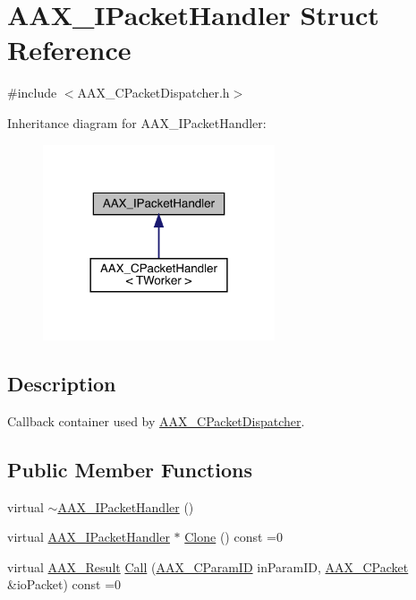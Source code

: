 \hypertarget{a01521}{}\section{A\+A\+X\+\_\+\+I\+Packet\+Handler Struct Reference}
\label{a01521}


{\ttfamily \#include $<$A\+A\+X\+\_\+\+C\+Packet\+Dispatcher.\+h$>$}



Inheritance diagram for A\+A\+X\+\_\+\+I\+Packet\+Handler\+:
\nopagebreak
\begin{figure}[H]
\begin{center}
\leavevmode
\includegraphics[width=194pt]{a01520}
\end{center}
\end{figure}


\subsection{Description}
Callback container used by \mbox{\hyperlink{a01529}{A\+A\+X\+\_\+\+C\+Packet\+Dispatcher}}. \subsection*{Public Member Functions}
\begin{DoxyCompactItemize}
\item 
virtual \mbox{\hyperlink{a01521_afaf774273572161ec49338cbf7e53a19}{$\sim$\+A\+A\+X\+\_\+\+I\+Packet\+Handler}} ()
\item 
virtual \mbox{\hyperlink{a01521}{A\+A\+X\+\_\+\+I\+Packet\+Handler}} $\ast$ \mbox{\hyperlink{a01521_a1d6270e9a6fb871ca6b83b1275533377}{Clone}} () const =0
\item 
virtual \mbox{\hyperlink{a00392_a4d8f69a697df7f70c3a8e9b8ee130d2f}{A\+A\+X\+\_\+\+Result}} \mbox{\hyperlink{a01521_ab7b07bf6eb7f8f33ee3174ad54716de1}{Call}} (\mbox{\hyperlink{a00392_a1440c756fe5cb158b78193b2fc1780d1}{A\+A\+X\+\_\+\+C\+Param\+ID}} in\+Param\+ID, \mbox{\hyperlink{a01513}{A\+A\+X\+\_\+\+C\+Packet}} \&io\+Packet) const =0
\end{DoxyCompactItemize}


